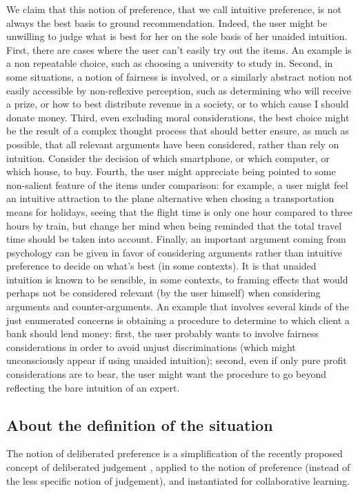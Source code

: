 \documentclass[french, english]{da2pl2018}
\begin{document}
We claim that this notion of preference, that we call intuitive preference, is not always the best basis to ground recommendation. Indeed, the user might be unwilling to judge what is best for her on the sole basis of her unaided intuition. First, there are cases where the user can’t easily try out the items. An example is a non repeatable choice, such as choosing a university to study in. Second, in some situations, a notion of fairness is involved, or a similarly abstract notion not easily accessible by non-reflexive perception, such as determining who will receive a prize, or how to best distribute revenue in a society, or to which cause I should donate money. Third, even excluding moral considerations, the best choice might be the result of a complex thought process that should better ensure, as much as possible, that all relevant arguments have been considered, rather than rely on intuition. Consider the decision of which smartphone, or which computer, or which house, to buy. Fourth, the user might appreciate being pointed to some non-salient feature of the items under comparison: for example, a user might feel an intuitive attraction to the plane alternative when chosing a transportation means for holidays, seeing that the flight time is only one hour compared to three hours by train, but change her mind when being reminded that the total travel time should be taken into account. Finally, an important argument coming from psychology can be given in favor of considering arguments rather than intuitive preference to decide on what’s best (in some contexts). It is that unaided intuition is known to be sensible, in some contexts, to framing effects that would perhaps not be considered relevant (by the user himself) when considering arguments and counter-arguments. An example that involves several kinds of the just enumerated concerns is obtaining a procedure to determine to which client a bank should lend money: first, the user probably wants to involve fairness considerations in order to avoid unjust discriminations (which might unconsciously appear if using unaided intuition); second, even if only pure profit considerations are to bear, the user might want the procedure to go beyond reflecting the bare intuition of an expert.

\subsection{About the definition of the situation}
The notion of deliberated preference is a simplification of the recently proposed concept of deliberated judgement \citep{cailloux_formal_2018}, applied to the notion of preference (instead of the less specific notion of judgement), and instantiated for collaborative learning.
\end{document}
